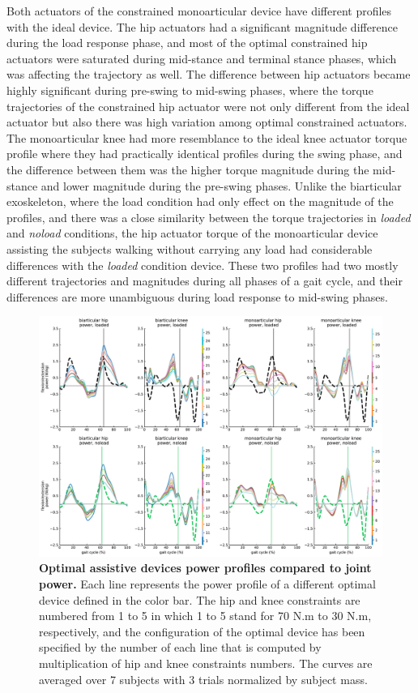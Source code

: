 \documentclass[10pt,letterpaper]{article}
\begin{document}
Both actuators of the constrained monoarticular device have different profiles with the ideal device. The hip actuators had a significant magnitude difference during the load response phase, and most of the optimal constrained hip actuators were saturated during mid-stance and terminal stance phases, which was affecting the trajectory as well. The difference between hip actuators became highly significant during pre-swing to mid-swing phases, where the torque trajectories of the constrained hip actuator were not only different from the ideal actuator but also there was high variation among optimal constrained actuators. The monoarticular knee had more resemblance to the ideal knee actuator torque profile where they had practically identical profiles during the swing phase, and the difference between them was the higher torque magnitude during the mid-stance and lower magnitude during the pre-swing phases. Unlike the biarticular exoskeleton, where the load condition had only effect on the magnitude of the profiles, and there was a close similarity between the torque trajectories in \textit{loaded} and \textit{noload} conditions, the hip actuator torque of the monoarticular device assisting the subjects walking without carrying any load had considerable differences with the \textit{loaded} condition device. These two profiles had two mostly different trajectories and magnitudes during all phases of a gait cycle, and their differences are more unambiguous during load response to mid-swing phases.\\
\begin{figure}[ht]   
	\centering
	\includegraphics[width=\linewidth]{Pareto_Simulations_Figures/PaperFigure_Paretofront_PowerProfiles.pdf}
	\vspace{1mm}
		\caption{{\small\textbf{Optimal assistive devices power profiles compared to joint power.} Each line represents the power profile of a different optimal device defined in the color bar. The hip and knee constraints are numbered from 1 to 5 in which 1 to 5 stand for 70 N.m to 30 N.m, respectively, and the configuration of the optimal device has been specified by the number of each line that is computed by multiplication of hip and knee constraints numbers. The curves are averaged over 7 subjects with 3 trials normalized by subject mass.}}
	\label{Fig_Paretofronts_Power_Profiles}
\end{figure}
\end{document}
